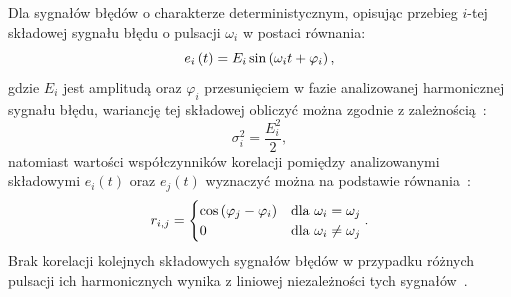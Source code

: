 Dla sygnałów błędów o charakterze deterministycznym, opisując przebieg $i$-tej składowej sygnału błędu o pulsacji $\omega_{i}$ w postaci równania:
\begin{equation}
e_{i} \left(t\right) = E_{i} \sin \left( \omega_{i} t + \varphi_{i} \right) \label{eq:dyn_harm},
\end{equation}
gdzie $E_{i}$ jest amplitudą oraz $\varphi_{i}$ przesunięciem w fazie analizowanej harmonicznej sygnału błędu, wariancję tej składowej obliczyć można zgodnie z zależnością~\cite{oppenheim_sns, jakubiec_system}:
\begin{equation}
\sigma_{i}^{2} = \frac{E_{i}^{2}}{2} \label{eq:dyn_var},
\end{equation}
natomiast wartości współczynników korelacji pomiędzy analizowanymi składowymi $e_{i}(t)$ oraz $e_{j}(t)$ wyznaczyć można na podstawie równania~\cite{oppenheim_sns, jakubiec_system}:
\begin{equation}
r_{i,j} =
\begin{cases}
\cos \left( \varphi_{j} - \varphi_{i} \right) & $dla $ \omega_{i} = \omega_{j} \\
0                                             & $dla $ \omega_{i} \ne \omega_{j}
\end{cases}
\label{eq:dyn_corr}.
\end{equation}
Brak korelacji kolejnych składowych sygnałów błędów w przypadku różnych pulsacji ich harmonicznych wynika z liniowej niezależności tych sygnałów~\cite{oppenheim_sns, proakis_dsp}.

